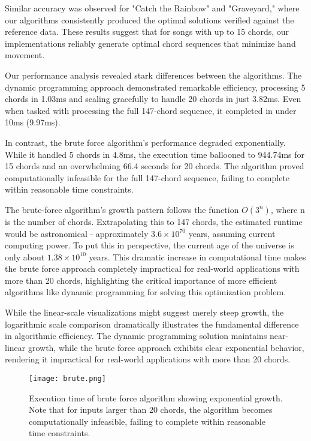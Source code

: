 \documentclass[lettersize,journal]{IEEEtran}
\begin{document}
Similar accuracy was observed for "Catch the Rainbow" and "Graveyard," where our algorithms consistently produced the optimal solutions verified against the reference data. These results suggest that for songs with up to 15 chords, our implementations reliably generate optimal chord sequences that minimize hand movement.

Our performance analysis revealed stark differences between the algorithms. The dynamic programming approach demonstrated remarkable efficiency, processing 5 chords in 1.03ms and scaling gracefully to handle 20 chords in just 3.82ms. Even when tasked with processing the full 147-chord sequence, it completed in under 10ms (9.97ms).

In contrast, the brute force algorithm's performance degraded exponentially. While it handled 5 chords in 4.8ms, the execution time ballooned to 944.74ms for 15 chords and an overwhelming 66.4 seconds for 20 chords. The algorithm proved computationally infeasible for the full 147-chord sequence, failing to complete within reasonable time constraints.

The brute-force algorithm's growth pattern follows the function $O(3^n)$, where n is the number of chords. Extrapolating this to 147 chords, the estimated runtime would be astronomical - approximately $3.6 \times 10^{70}$ years, assuming current computing power. To put this in perspective, the current age of the universe is only about $1.38 \times 10^{10}$ years. This dramatic increase in computational time makes the brute force approach completely impractical for real-world applications with more than 20 chords, highlighting the critical importance of more efficient algorithms like dynamic programming for solving this optimization problem.

While the linear-scale visualizations might suggest merely steep growth, the logarithmic scale comparison dramatically illustrates the fundamental difference in algorithmic efficiency. The dynamic programming solution maintains near-linear growth, while the brute force approach exhibits clear exponential behavior, rendering it impractical for real-world applications with more than 20 chords.

\begin{figure}[h!]
    \centering
    \texttt{[image: brute.png]}
    \caption{Execution time of brute force algorithm showing exponential growth. Note that for inputs larger than 20 chords, the algorithm becomes computationally infeasible, failing to complete within reasonable time constraints.}
\end{figure}
\end{document}
